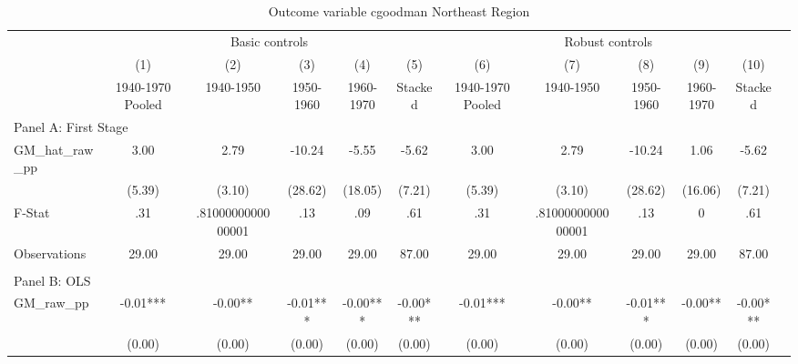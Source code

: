  \begin{table}[htbp]\centering {} \begin{threeparttable} \caption{Outcome variable cgoodman Northeast Region} \begin{tabular}{l*{11}{c}} \toprule
          &\multicolumn{5}{c}{Basic controls}                                   &\multicolumn{5}{c}{Robust controls}                                  \\\cmidrule(lr){2-6}\cmidrule(lr){7-11}
          &\multicolumn{1}{c}{(1)}&\multicolumn{1}{c}{(2)}&\multicolumn{1}{c}{(3)}&\multicolumn{1}{c}{(4)}&\multicolumn{1}{c}{(5)}&\multicolumn{1}{c}{(6)}&\multicolumn{1}{c}{(7)}&\multicolumn{1}{c}{(8)}&\multicolumn{1}{c}{(9)}&\multicolumn{1}{c}{(10)}\\
          &\multicolumn{1}{c}{1940-1970 Pooled}&\multicolumn{1}{c}{1940-1950}&\multicolumn{1}{c}{1950-1960}&\multicolumn{1}{c}{1960-1970}&\multicolumn{1}{c}{Stacked}&\multicolumn{1}{c}{1940-1970 Pooled}&\multicolumn{1}{c}{1940-1950}&\multicolumn{1}{c}{1950-1960}&\multicolumn{1}{c}{1960-1970}&\multicolumn{1}{c}{Stacked}\\
\cmidrule(lr){1-11}
\multicolumn{10}{l}{Panel A: First Stage}\\
\cmidrule(lr){1-11}
GM\_hat\_raw\_pp&      3.00   &      2.79   &    -10.24   &     -5.55   &     -5.62   &      3.00   &      2.79   &    -10.24   &      1.06   &     -5.62   \\
          &    (5.39)   &    (3.10)   &   (28.62)   &   (18.05)   &    (7.21)   &    (5.39)   &    (3.10)   &   (28.62)   &   (16.06)   &    (7.21)   \\
\midrule
F-Stat    &       .31   &.8100000000000001   &       .13   &       .09   &       .61   &       .31   &.8100000000000001   &       .13   &         0   &       .61   \\
Observations&     29.00   &     29.00   &     29.00   &     29.00   &     87.00   &     29.00   &     29.00   &     29.00   &     29.00   &     87.00   \\
\cmidrule[\heavyrulewidth](lr){1-11} \\ \cmidrule[\heavyrulewidth](lr){1-11}
\multicolumn{10}{l}{Panel B: OLS}\\
\cmidrule(lr){1-11}
GM\_raw\_pp &     -0.01***&     -0.00** &     -0.01***&     -0.00***&     -0.00***&     -0.01***&     -0.00** &     -0.01***&     -0.00** &     -0.00***\\
          &    (0.00)   &    (0.00)   &    (0.00)   &    (0.00)   &    (0.00)   &    (0.00)   &    (0.00)   &    (0.00)   &    (0.00)   &    (0.00)   \\

\end{tabular}
\end{threeparttable}
\end{table}
